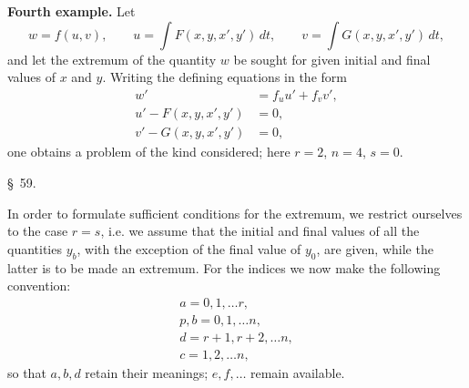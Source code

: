 \documentclass[11pt,a4paper,leqno]{article}
\begin{document}
\noindent\textbf{Fourth example.} Let
\[
w=f(u,v),\qquad
u=\int F(x,y,x',y')\,dt,\qquad
v=\int G(x,y,x',y')\,dt,
\]
and let the extremum of the quantity $w$ be sought for given initial and final values of $x$ and $y$. Writing the defining equations in the form
\[
\begin{aligned}
w'&=f_u u'+f_v v',\\
u'-F(x,y,x',y')&=0,\\
v'-G(x,y,x',y')&=0,
\end{aligned}
\]
one obtains a problem of the kind considered; here $r=2$, $n=4$, $s=0$.


\begin{center}
{\large \S~59.}
\end{center}

In order to formulate sufficient conditions for the extremum, we restrict ourselves to the case $r=s$, i.e. we assume that the initial and final values of all the quantities $y_b$, with the exception of the final value of $y_0$, are given, while the latter is to be made an extremum. For the indices we now make the following convention:
\[
\begin{gathered}
a=0,1,\ldots r,\\
p,b=0,1,\ldots n,\\
d=r+1,r+2,\ldots n,\\
c=1,2,\ldots n,
\end{gathered}
\]
so that $a,b,d$ retain their meanings; $e,f,\ldots$ remain available.
\end{document}
